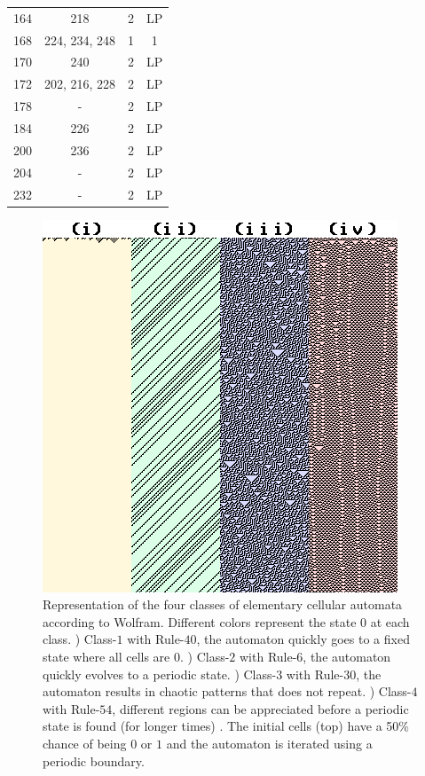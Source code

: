 \begin{table}
\begin{tabular}{|c|c|c|c}
        164 & 218 & 2 & LP \\
        168 & 224, 234, 248 & 1 & 1 \\
        170 & 240 & 2 & LP \\
        172 & 202, 216, 228 & 2 & LP \\
        178 & - & 2 & LP \\
        184 & 226 & 2 & LP \\
        200 & 236 & 2 & LP \\
        204 & - & 2 & LP \\
        232 & - & 2 & LP \\
    \end{tabular}
\end{table}





\begin{figure}
    \centering
    \includegraphics[width=\textwidth]{Images/P4/4classes.png}
    \caption{Representation of the four classes of elementary cellular automata according to Wolfram. Different colors represent the state $0$ at each class. ) Class-$1$ with Rule-$40$, the automaton quickly goes to a fixed state where all cells are $0$. ) Class-$2$ with Rule-$6$, the automaton quickly evolves to a periodic state. ) Class-$3$ with Rule-$30$, the automaton results in chaotic patterns that does not repeat. ) Class-$4$ with Rule-$54$, different regions can be appreciated before a periodic state is found (for longer times) . The initial cells (top) have a 50\% chance of being $0$ or $1$ and the automaton is iterated using a periodic boundary. }
    \label{fig:4classes}
\end{figure}





